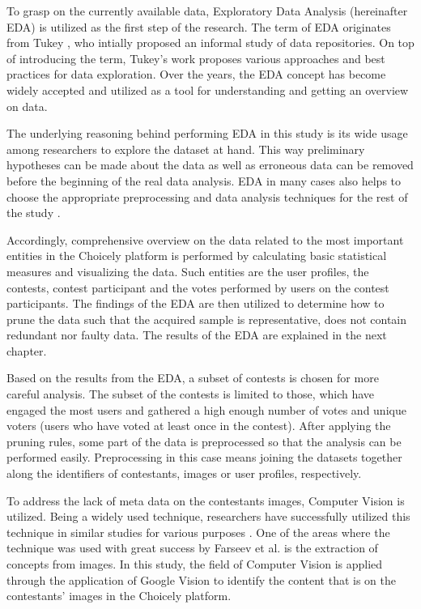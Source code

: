 To grasp on the currently available data, Exploratory Data Analysis (hereinafter EDA) is utilized as the first step of the research. The term of EDA originates from Tukey \cite{tukey77}, who intially proposed an informal study of data repositories. On top of introducing the term, Tukey's work proposes various approaches and best practices for data exploration. Over the years, the EDA concept has become widely accepted and utilized as a tool for understanding and getting an overview on data. 

The underlying reasoning behind performing EDA in this study is its wide usage among researchers to explore the dataset at hand. This way preliminary hypotheses can be made about the data as well as erroneous data can be removed before the beginning of the real data analysis. EDA in many cases also helps to choose the appropriate preprocessing and data analysis techniques for the rest of the study \cite{tukey77, introtodatamining}. 

Accordingly, comprehensive overview on the data related to the most important entities in the Choicely platform is performed by calculating basic statistical measures and visualizing the data. Such entities are the user profiles, the contests, contest participant and the votes performed by users on the contest participants. The findings of the EDA are then utilized to determine how to prune the data such that the acquired sample is representative, does not contain redundant nor faulty data. The results of the EDA are explained in the next chapter. 

Based on the results from the EDA, a subset of contests is chosen for more careful analysis. The subset of the contests is limited to those, which have engaged the most users and gathered a high enough number of votes and unique voters (users who have voted at least once in the contest). After applying the pruning rules, some part of the data is preprocessed so that the analysis can be performed easily. Preprocessing in this case means joining the datasets together along the identifiers of contestants, images or user profiles, respectively.  

To address the lack of meta data on the contestants images, Computer Vision is utilized. Being a widely used technique, researchers have successfully utilized this technique in similar studies for various purposes \cite{hu2014we, farseev2015harvestingmultiplesources, han2016teensarefrommars, bakhshi2014faces}. One of the areas where the technique was used with great success by Farseev et al. \cite{farseev2015harvestingmultiplesources} is the extraction of concepts from images. In this study, the field of Computer Vision is applied through the application of Google Vision to identify the content that is on the contestants' images in the Choicely platform. 

